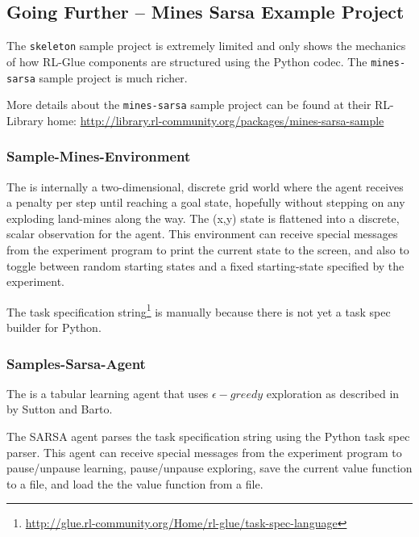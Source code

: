 \documentclass[11pt]{article}
\begin{document}
\subsection{Going Further -- Mines Sarsa Example Project}
\label{mines-sarsa-sample}
The \texttt{skeleton} sample project is extremely limited and only shows the mechanics of how RL-Glue components are structured using the Python codec.  The \texttt{mines-sarsa} sample project is much richer.

More details about the \texttt{mines-sarsa} sample project can be found at their RL-Library home:\newline
\url{http://library.rl-community.org/packages/mines-sarsa-sample}


\subsubsection{Sample-Mines-Environment}
\label{mines-sample}
The 
is internally a two-dimensional, discrete grid world where the agent receives a penalty per step until reaching a goal state, hopefully without stepping on any exploding land-mines along the way.  The (x,y) state is flattened into a discrete, scalar observation for the agent.  This environment can receive special messages from the experiment program to print the current state to the screen, and also to toggle between random starting states and a fixed starting-state specified by the experiment.

The task specification string\footnote{\url{http://glue.rl-community.org/Home/rl-glue/task-spec-language}} is manually because there is not yet a task spec builder for Python. 

\subsubsection{Samples-Sarsa-Agent}
\label{sarsa-sample}
The 
is a tabular learning agent that uses $\epsilon-greedy$ exploration as described in  by Sutton and Barto.

The SARSA agent parses the task specification string using the Python task spec parser.  This agent can receive special messages from the experiment program to pause/unpause learning, pause/unpause exploring, save the current value function to a file, and load the the value function from a file.
\end{document}
